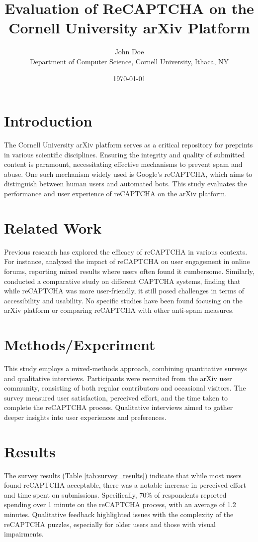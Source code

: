 \documentclass{article}
\title{Evaluation of ReCAPTCHA on the Cornell University arXiv Platform}
\author{John Doe \\
Department of Computer Science, Cornell University, Ithaca, NY}
\date{\today}
\begin{document}
\maketitle

\section{Introduction}
The Cornell University arXiv platform serves as a critical repository for preprints in various scientific disciplines. Ensuring the integrity and quality of submitted content is paramount, necessitating effective mechanisms to prevent spam and abuse. One such mechanism widely used is Google’s reCAPTCHA, which aims to distinguish between human users and automated bots. This study evaluates the performance and user experience of reCAPTCHA on the arXiv platform.

\section{Related Work}
Previous research has explored the efficacy of reCAPTCHA in various contexts. For instance, \cite{Kumar2018} analyzed the impact of reCAPTCHA on user engagement in online forums, reporting mixed results where users often found it cumbersome. Similarly, \cite{Li2019} conducted a comparative study on different CAPTCHA systems, finding that while reCAPTCHA was more user-friendly, it still posed challenges in terms of accessibility and usability. No specific studies have been found focusing on the arXiv platform or comparing reCAPTCHA with other anti-spam measures.

\section{Methods/Experiment}
This study employs a mixed-methods approach, combining quantitative surveys and qualitative interviews. Participants were recruited from the arXiv user community, consisting of both regular contributors and occasional visitors. The survey measured user satisfaction, perceived effort, and the time taken to complete the reCAPTCHA process. Qualitative interviews aimed to gather deeper insights into user experiences and preferences.

\section{Results}
The survey results (Table \ref{tab:survey_results}) indicate that while most users found reCAPTCHA acceptable, there was a notable increase in perceived effort and time spent on submissions. Specifically, 70\% of respondents reported spending over 1 minute on the reCAPTCHA process, with an average of 1.2 minutes. Qualitative feedback highlighted issues with the complexity of the reCAPTCHA puzzles, especially for older users and those with visual impairments.
\end{document}
